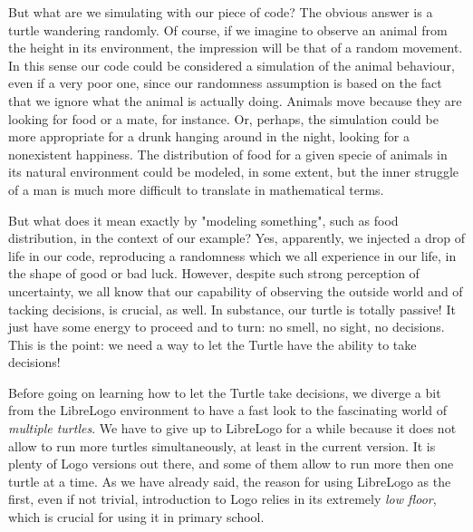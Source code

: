 But what are we simulating with our piece of code? The obvious answer is a turtle wandering randomly. Of course, if we imagine to observe an animal from the height in its environment, the impression will be that of a random movement. In this sense our code could be considered a simulation of the animal behaviour, even if a very poor one, since our randomness assumption is based on the fact that we ignore what the animal is actually doing. Animals move because they are looking for food or a mate, for instance. Or, perhaps, the simulation could be more appropriate for a drunk hanging around in the night, looking for a nonexistent happiness. The distribution of food for a given specie of animals in its natural environment could be modeled, in some extent, but the inner struggle of a man is much more difficult to translate in mathematical terms.

But what does it mean exactly by "modeling something", such as food distribution, in the context of our example? Yes, apparently, we injected a drop of life in our code, reproducing a randomness which we all experience in our life, in the shape of good or bad luck. However, despite such strong perception of uncertainty, we all know that our capability of observing the outside world and of tacking decisions, is crucial, as well. In substance, our turtle is totally passive! It just have some energy to proceed and to turn: no smell, no sight, no decisions. This is the point: we need a way to let the Turtle have the ability to take decisions!

Before going on learning how to let the Turtle take decisions, we diverge a bit from the LibreLogo environment to have a fast look to the fascinating world of \textit{multiple turtles}. We have to give up to LibreLogo for a while because it does not allow to run more turtles simultaneously, at least in the current version. It is plenty of Logo versions out there, and some of them allow to run more then one turtle at a time. As we have already said, the reason for using LibreLogo as the first, even if not trivial, introduction to Logo relies in its extremely \textit{low floor}, which is crucial for using it in primary school.

\vskip 1cm

